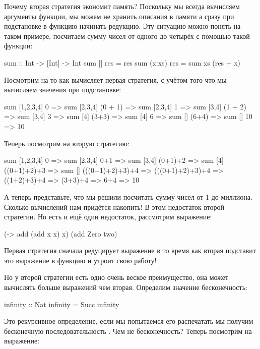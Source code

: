 Почему вторая стратегия экономит память? Поскольку мы всегда
вычисляем аргументы функции, мы можем не хранить описания
в памяти а сразу при подстановке в функцию начинать редукцию.
Эту ситуацию можно понять на таком примере, посчитаем сумму чисел
от одного до четырёх с помощью такой функции:

\begin{code}
sum :: Int -> [Int] -> Int
sum []      res = res
sum (x:xs)  res = sum xs (res + x) 
\end{code}

Посмотрим на то как вычисляет первая стратегия, с учётом
того что мы вычисляем значения при подстановке:

\begin{code}
        sum [1,2,3,4] 0
=>      sum [2,3,4]   (0 + 1)    
=>      sum [2,3,4]   1
=>      sum [3,4]     (1 + 2)
=>      sum [3,4]     3
=>      sum [4]       (3+3)
=>      sum [4]       6
=>      sum []        (6+4)
=>      sum []        10
=>      10
\end{code}

Теперь посмотрим на вторую стратегию:

\begin{code}
        sum [1,2,3,4] 0
=>      sum [2,3,4]   0+1
=>      sum [3,4]     (0+1)+2
=>      sum [4]       ((0+1)+2)+3
=>      sum []        (((0+1)+2)+3)+4
=>      (((0+1)+2)+3)+4
=>      ((1+2)+3)+4
=>      (3+3)+4
=>      6+4
=>      10
\end{code}

А теперь представьте, что мы решили посчитать сумму чисел
от 1 до миллиона. Сколько вычислений нам придётся накопить!
В этом недостаток второй стратегии. 
Но есть и ещё один недостаток, рассмотрим выражение:

\begin{code}
(\x -> add (add x x) x) (add Zero two)
\end{code}

Первая стратегия сначала редуцирует выражение 
в то время как вторая подставит это выражение в функцию
и утроит свою работу!

Но у второй стратегии есть одно очень веское преимущество,
она может вычислять больше выражений чем вторая. Определим 
значение бесконечность:

\begin{code}
infinity    :: Nat
infinity    = Succ infinity
\end{code}

Это рекурсивное определение, если мы попытаемся его распечатать
мы получим бесконечную последовательность . Чем не 
бесконечность? Теперь посмотрим на выражение:

